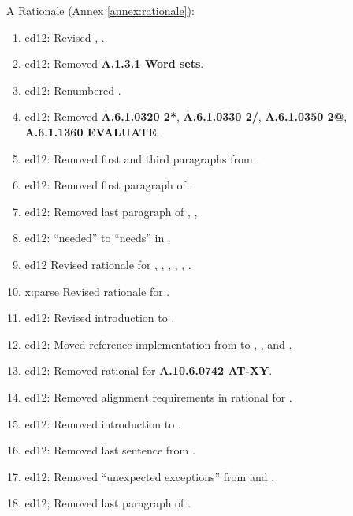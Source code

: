 \begin{itemize}
	\item[A] Rationale (Annex \ref{annex:rationale}):				%
		\begin{enumerate}
		\item \textsf{ed12}: Revised , .
		\item \textsf{ed12}: Removed \textbf{A.1.3.1 Word sets}.
		\item \textsf{ed12}: Renumbered .
		\item \textsf{ed12}: Removed
			\textbf{A.6.1.0320 2*},
			\textbf{A.6.1.0330 2/},
			\textbf{A.6.1.0350 2@},
			\textbf{A.6.1.1360 EVALUATE}.
		\item \textsf{ed12}: Removed first and third paragraphs from .
		\item \textsf{ed12}: Removed first paragraph of .
		\item \textsf{ed12}: Removed last paragraph of ,
			,
		\item \textsf{ed12}: ``needed'' to ``needs'' in .
		\item \textsf{ed12} Revised rationale for ,
			, , ,
			, .
		\item \textsf{x:parse} Revised rationale for .
		\item \textsf{ed12}: Revised introduction to .
		\item \textsf{ed12}: Moved reference implementation from
			 to \linebreak {}, ,
			 and .
		\item \textsf{ed12}: Removed rational for \textbf{A.10.6.0742 AT-XY}.
		\item \textsf{ed12}: Removed alignment requirements in rational for
			.
		\item \textsf{ed12}: Removed introduction to .
		\item \textsf{ed12}: Removed last sentence from .
		\item \textsf{ed12}: Removed ``unexpected exceptions'' from
			 and .
		\item \textsf{ed12}; Removed last paragraph of .

\end{enumerate}
\end{itemize}
